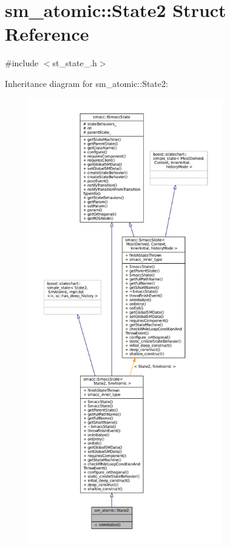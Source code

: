 \hypertarget{structsm__atomic_1_1State2}{}\section{sm\+\_\+atomic\+:\+:State2 Struct Reference}
\label{structsm__atomic_1_1State2}


{\ttfamily \#include $<$st\+\_\+state\+\_.\+h$>$}



Inheritance diagram for sm\+\_\+atomic\+:\+:State2\+:
\nopagebreak
\begin{figure}[H]
\begin{center}
\leavevmode
\includegraphics[height=550pt]{structsm__atomic_1_1State2__inherit__graph}
\end{center}
\end{figure}


